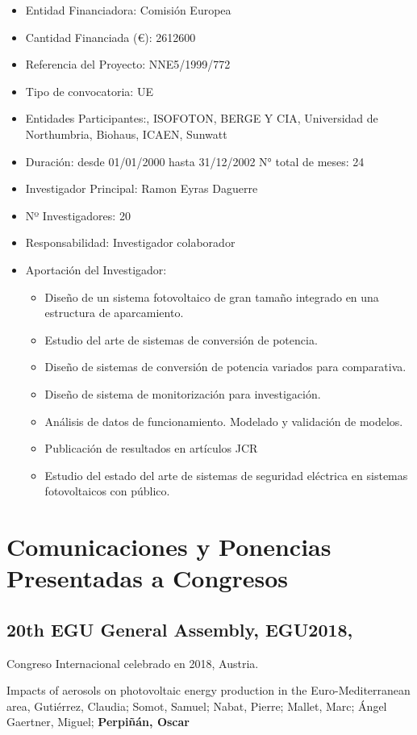 \documentclass[article, a4paper]{memoir}
\begin{document}
\begin{itemize}
\item Entidad Financiadora: Comisión Europea
\item Cantidad Financiada (€): 2612600
\item Referencia del Proyecto: NNE5/1999/772
\item Tipo de convocatoria: UE
\item Entidades Participantes:, ISOFOTON, BERGE Y CIA, Universidad de Northumbria, Biohaus, ICAEN, Sunwatt
\item Duración: desde 01/01/2000 hasta 31/12/2002 N° total de meses: 24
\item Investigador Principal: Ramon Eyras Daguerre
\item Nº Investigadores: 20
\item Responsabilidad: Investigador colaborador
\item Aportación del Investigador:
\begin{itemize}
\item Diseño de un sistema fotovoltaico de gran tamaño integrado en una estructura de aparcamiento.
\item Estudio del arte de sistemas de conversión de potencia.
\item Diseño de sistemas de conversión de potencia variados para comparativa.
\item Diseño de sistema de monitorización para investigación.
\item Análisis de datos de funcionamiento. Modelado y validación de modelos.
\item Publicación de resultados en artículos JCR
\item Estudio del estado del arte de sistemas de seguridad eléctrica en sistemas fotovoltaicos con público.
\end{itemize}
\end{itemize}


\section{Comunicaciones y Ponencias Presentadas a Congresos}
\label{sec:org6beaf2c}
\subsection{20th EGU General Assembly, EGU2018,}
\label{sec:orgb43332a}
Congreso Internacional celebrado en 2018, Austria.

Impacts of aerosols on photovoltaic energy production in the Euro-Mediterranean area, Gutiérrez, Claudia; Somot, Samuel; Nabat, Pierre; Mallet, Marc; Ángel Gaertner, Miguel; \textbf{Perpiñán, Oscar}
\end{document}

